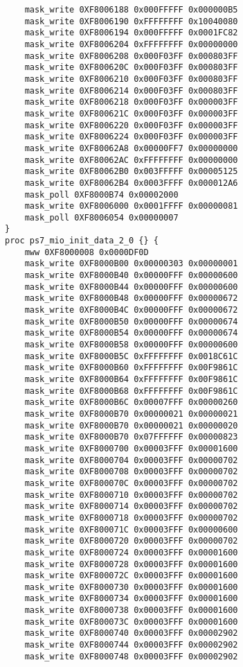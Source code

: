 \begin{lstlisting}
    mask_write 0XF8006188 0x000FFFFF 0x000000B5
    mask_write 0XF8006190 0xFFFFFFFF 0x10040080
    mask_write 0XF8006194 0x000FFFFF 0x0001FC82
    mask_write 0XF8006204 0xFFFFFFFF 0x00000000
    mask_write 0XF8006208 0x000F03FF 0x000803FF
    mask_write 0XF800620C 0x000F03FF 0x000803FF
    mask_write 0XF8006210 0x000F03FF 0x000803FF
    mask_write 0XF8006214 0x000F03FF 0x000803FF
    mask_write 0XF8006218 0x000F03FF 0x000003FF
    mask_write 0XF800621C 0x000F03FF 0x000003FF
    mask_write 0XF8006220 0x000F03FF 0x000003FF
    mask_write 0XF8006224 0x000F03FF 0x000003FF
    mask_write 0XF80062A8 0x00000FF7 0x00000000
    mask_write 0XF80062AC 0xFFFFFFFF 0x00000000
    mask_write 0XF80062B0 0x003FFFFF 0x00005125
    mask_write 0XF80062B4 0x0003FFFF 0x000012A6
    mask_poll 0XF8000B74 0x00002000
    mask_write 0XF8006000 0x0001FFFF 0x00000081
    mask_poll 0XF8006054 0x00000007
}
proc ps7_mio_init_data_2_0 {} {
    mww 0XF8000008 0x0000DF0D
    mask_write 0XF8000B00 0x00000303 0x00000001
    mask_write 0XF8000B40 0x00000FFF 0x00000600
    mask_write 0XF8000B44 0x00000FFF 0x00000600
    mask_write 0XF8000B48 0x00000FFF 0x00000672
    mask_write 0XF8000B4C 0x00000FFF 0x00000672
    mask_write 0XF8000B50 0x00000FFF 0x00000674
    mask_write 0XF8000B54 0x00000FFF 0x00000674
    mask_write 0XF8000B58 0x00000FFF 0x00000600
    mask_write 0XF8000B5C 0xFFFFFFFF 0x0018C61C
    mask_write 0XF8000B60 0xFFFFFFFF 0x00F9861C
    mask_write 0XF8000B64 0xFFFFFFFF 0x00F9861C
    mask_write 0XF8000B68 0xFFFFFFFF 0x00F9861C
    mask_write 0XF8000B6C 0x00007FFF 0x00000260
    mask_write 0XF8000B70 0x00000021 0x00000021
    mask_write 0XF8000B70 0x00000021 0x00000020
    mask_write 0XF8000B70 0x07FFFFFF 0x00000823
    mask_write 0XF8000700 0x00003FFF 0x00001600
    mask_write 0XF8000704 0x00003FFF 0x00000702
    mask_write 0XF8000708 0x00003FFF 0x00000702
    mask_write 0XF800070C 0x00003FFF 0x00000702
    mask_write 0XF8000710 0x00003FFF 0x00000702
    mask_write 0XF8000714 0x00003FFF 0x00000702
    mask_write 0XF8000718 0x00003FFF 0x00000702
    mask_write 0XF800071C 0x00003FFF 0x00000600
    mask_write 0XF8000720 0x00003FFF 0x00000702
    mask_write 0XF8000724 0x00003FFF 0x00001600
    mask_write 0XF8000728 0x00003FFF 0x00001600
    mask_write 0XF800072C 0x00003FFF 0x00001600
    mask_write 0XF8000730 0x00003FFF 0x00001600
    mask_write 0XF8000734 0x00003FFF 0x00001600
    mask_write 0XF8000738 0x00003FFF 0x00001600
    mask_write 0XF800073C 0x00003FFF 0x00001600
    mask_write 0XF8000740 0x00003FFF 0x00002902
    mask_write 0XF8000744 0x00003FFF 0x00002902
    mask_write 0XF8000748 0x00003FFF 0x00002902

\end{lstlisting}
